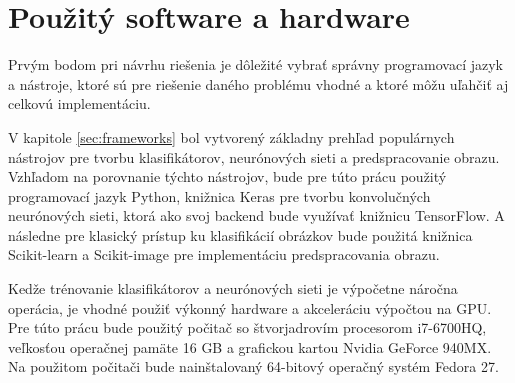 
\section{Použitý software a hardware}
\label{sec:softwarehardware}
Prvým bodom pri návrhu riešenia je dôležité vybrať správny programovací jazyk a nástroje, ktoré sú pre riešenie daného problému vhodné
    a ktoré môžu uľahčiť aj celkovú implementáciu.

V kapitole \ref{sec:frameworks} bol vytvorený základny prehľad populárnych nástrojov pre tvorbu klasifikátorov, neurónových sieti a predspracovanie obrazu.
Vzhľadom na porovnanie týchto nástrojov, bude pre túto prácu použitý programovací jazyk Python, knižnica Keras pre tvorbu konvolučných neurónových sieti, ktorá
    ako svoj backend bude využívať knižnicu TensorFlow.
A následne pre klasický prístup ku klasifikácií obrázkov bude použitá knižnica Scikit-learn a Scikit-image pre implementáciu predspracovania obrazu.

Kedže trénovanie klasifikátorov a neurónových sieti je výpočetne náročna operácia, je vhodné použiť výkonný hardware a akceleráciu výpočtou na GPU.
Pre túto prácu bude použitý počitač so štvorjadrovím procesorom i7-6700HQ, veľkosťou operačnej pamäte 16 GB a grafickou kartou Nvidia GeForce 940MX.
Na použitom počitači bude nainštalovaný 64-bitový operačný systém Fedora 27.

